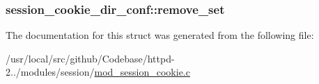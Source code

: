 \subsubsection[{\texorpdfstring{remove\+\_\+set}{remove_set}}]{ session\+\_\+cookie\+\_\+dir\+\_\+conf\+::remove\+\_\+set}\hypertarget{structsession__cookie__dir__conf_ad22ff664d6c771ba1ea948c4159a66ac}{}\label{structsession__cookie__dir__conf_ad22ff664d6c771ba1ea948c4159a66ac}


The documentation for this struct was generated from the following file\+:\begin{DoxyCompactItemize}
\item 
/usr/local/src/github/\+Codebase/httpd-\/2../modules/session/\hyperlink{mod__session__cookie_8c}{mod\+\_\+session\+\_\+cookie.\+c}\end{DoxyCompactItemize}

